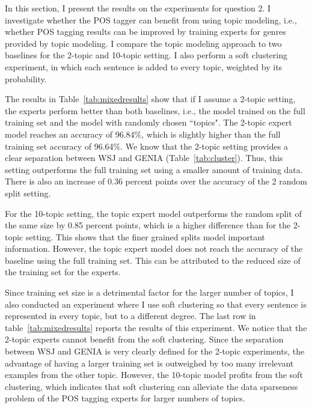 In this section, I present the results on the experiments for question 2. I investigate whether the POS tagger can benefit from using topic modeling, i.e., whether POS tagging results can be improved by training experts for genres provided by topic modeling. I compare the topic modeling approach to  two baselines for the 2-topic and 10-topic setting. I also perform a soft clustering experiment, in which each sentence is added to every topic, weighted by its probability.

The results in Table~\ref{tab:mixedresults} show that if I assume a 2-topic setting, the experts perform better than both baselines, i.e., the model trained on the full training set and the model with randomly chosen ``topics". The 2-topic expert model reaches an accuracy of 96.84\%, which is slightly higher than the full training set accuracy of 96.64\%. We know that the 2-topic setting provides a clear separation between WSJ and GENIA (Table~\ref{tab:cluster}). Thus, this setting outperforms the full training set using a smaller amount of training data. There is also an increase of 0.36 percent points over the accuracy of the 2 random split setting. 

For the 10-topic setting, the topic expert model outperforms the random split of the same size by 0.85 percent points, which is a higher difference than for the 2-topic setting. This shows that the finer grained  splits model important information. However, the topic expert model does not reach the accuracy of the baseline using the full training set. This can be attributed to the reduced size of the training set for the experts. 


Since training set size is a detrimental factor for the larger number of topics, I also conducted an experiment where I use soft clustering so that every sentence is represented in every topic, but to a different degree. The last row in table~\ref{tab:mixedresults} reports the results of this experiment. We notice that the 2-topic experts cannot benefit from the soft clustering. Since the separation between WSJ and GENIA is very clearly defined for the 2-topic experiments,  the advantage of having a larger training set is outweighed by too many irrelevant examples from the other topic. However, the 10-topic model profits from the soft clustering, which indicates that soft clustering can alleviate the data sparseness problem of the POS tagging experts for larger numbers of topics. 

